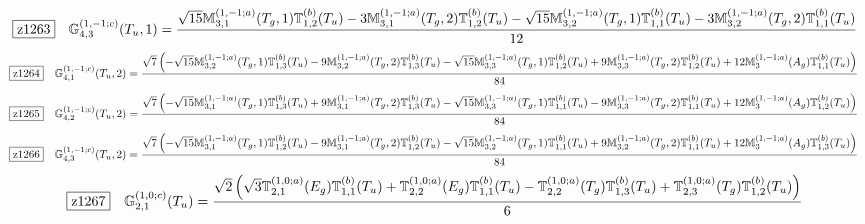 \documentclass[fleqn,10pt,landscape]{jsarticle}
\begin{document}
\begin{dmath*}
\hspace*{3mm}\fbox{z1263}\quad \mathbb{G}_{4,3}^{(1,-1;c)}(T_{u},1)=\frac{\sqrt{15} \mathbb{M}_{3,1}^{(1,-1;a)}(T_{g},1) \mathbb{T}_{1,2}^{(b)}(T_{u}) - 3 \mathbb{M}_{3,1}^{(1,-1;a)}(T_{g},2) \mathbb{T}_{1,2}^{(b)}(T_{u}) - \sqrt{15} \mathbb{M}_{3,2}^{(1,-1;a)}(T_{g},1) \mathbb{T}_{1,1}^{(b)}(T_{u}) - 3 \mathbb{M}_{3,2}^{(1,-1;a)}(T_{g},2) \mathbb{T}_{1,1}^{(b)}(T_{u})}{12}
\end{dmath*}
\begin{dmath*}
\hspace*{3mm}\fbox{z1264}\quad \mathbb{G}_{4,1}^{(1,-1;c)}(T_{u},2)=\frac{\sqrt{7} \left(- \sqrt{15} \mathbb{M}_{3,2}^{(1,-1;a)}(T_{g},1) \mathbb{T}_{1,3}^{(b)}(T_{u}) - 9 \mathbb{M}_{3,2}^{(1,-1;a)}(T_{g},2) \mathbb{T}_{1,3}^{(b)}(T_{u}) - \sqrt{15} \mathbb{M}_{3,3}^{(1,-1;a)}(T_{g},1) \mathbb{T}_{1,2}^{(b)}(T_{u}) + 9 \mathbb{M}_{3,3}^{(1,-1;a)}(T_{g},2) \mathbb{T}_{1,2}^{(b)}(T_{u}) + 12 \mathbb{M}_{3}^{(1,-1;a)}(A_{g}) \mathbb{T}_{1,1}^{(b)}(T_{u})\right)}{84}
\end{dmath*}
\begin{dmath*}
\hspace*{3mm}\fbox{z1265}\quad \mathbb{G}_{4,2}^{(1,-1;c)}(T_{u},2)=\frac{\sqrt{7} \left(- \sqrt{15} \mathbb{M}_{3,1}^{(1,-1;a)}(T_{g},1) \mathbb{T}_{1,3}^{(b)}(T_{u}) + 9 \mathbb{M}_{3,1}^{(1,-1;a)}(T_{g},2) \mathbb{T}_{1,3}^{(b)}(T_{u}) - \sqrt{15} \mathbb{M}_{3,3}^{(1,-1;a)}(T_{g},1) \mathbb{T}_{1,1}^{(b)}(T_{u}) - 9 \mathbb{M}_{3,3}^{(1,-1;a)}(T_{g},2) \mathbb{T}_{1,1}^{(b)}(T_{u}) + 12 \mathbb{M}_{3}^{(1,-1;a)}(A_{g}) \mathbb{T}_{1,2}^{(b)}(T_{u})\right)}{84}
\end{dmath*}
\begin{dmath*}
\hspace*{3mm}\fbox{z1266}\quad \mathbb{G}_{4,3}^{(1,-1;c)}(T_{u},2)=\frac{\sqrt{7} \left(- \sqrt{15} \mathbb{M}_{3,1}^{(1,-1;a)}(T_{g},1) \mathbb{T}_{1,2}^{(b)}(T_{u}) - 9 \mathbb{M}_{3,1}^{(1,-1;a)}(T_{g},2) \mathbb{T}_{1,2}^{(b)}(T_{u}) - \sqrt{15} \mathbb{M}_{3,2}^{(1,-1;a)}(T_{g},1) \mathbb{T}_{1,1}^{(b)}(T_{u}) + 9 \mathbb{M}_{3,2}^{(1,-1;a)}(T_{g},2) \mathbb{T}_{1,1}^{(b)}(T_{u}) + 12 \mathbb{M}_{3}^{(1,-1;a)}(A_{g}) \mathbb{T}_{1,3}^{(b)}(T_{u})\right)}{84}
\end{dmath*}
\begin{dmath*}
\hspace*{3mm}\fbox{z1267}\quad \mathbb{G}_{2,1}^{(1,0;c)}(T_{u})=\frac{\sqrt{2} \left(\sqrt{3} \mathbb{T}_{2,1}^{(1,0;a)}(E_{g}) \mathbb{T}_{1,1}^{(b)}(T_{u}) + \mathbb{T}_{2,2}^{(1,0;a)}(E_{g}) \mathbb{T}_{1,1}^{(b)}(T_{u}) - \mathbb{T}_{2,2}^{(1,0;a)}(T_{g}) \mathbb{T}_{1,3}^{(b)}(T_{u}) + \mathbb{T}_{2,3}^{(1,0;a)}(T_{g}) \mathbb{T}_{1,2}^{(b)}(T_{u})\right)}{6}
\end{dmath*}
\end{document}
